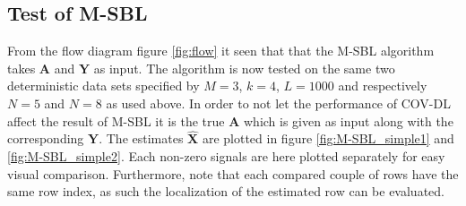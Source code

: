 \subsection{Test of M-SBL}
From the flow diagram figure \ref{fig:flow} it seen that that the M-SBL algorithm takes $\mathbf{A}$ and $\mathbf{Y}$ as input. The algorithm is now tested on the same two deterministic data sets specified by $M = 3$, $k = 4$, $L=1000$ and respectively $N = 5$ and $N = 8$ as used above. 
In order to not let the performance of COV-DL affect the result of M-SBL it is the true $\mathbf{A}$ which is given as input along with the corresponding $\mathbf{Y}$. The estimates $\hat{\mathbf{X}}$ are plotted in figure \ref{fig:M-SBL_simple1} and \ref{fig:M-SBL_simple2}. Each non-zero signals are here plotted separately for easy visual comparison. Furthermore, note that each compared couple of rows have the same row index, as such the localization of the estimated row can be evaluated.
